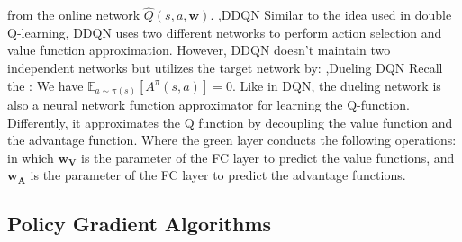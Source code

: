 \documentclass[10pt]{report}
\begin{document}
from the online network $\hat{Q}(s,a,\mathbf{w})$.
\sep{DDQN}
Similar to the idea used in double Q-learning, DDQN uses two different networks to perform action selection and value function approximation.
However, DDQN doesn't maintain two independent networks but utilizes the target network by:
\sep{Dueling DQN}
Recall the :
We have $\mathbb{E}_{a\sim\pi(s)}[A^{\pi}(s,a)]=0.$ Like in DQN, the dueling network is also a neural network function approximator for
learning the Q-function. Differently, it approximates the Q function by decoupling the value function and the advantage function.
Where the green layer conducts the following operations:
in which $\mathbf{w_V}$ is the parameter of the FC layer to predict the value functions, and $\mathbf{w_A}$ is the parameter of the FC layer to predict the advantage functions.

\subsection{Policy Gradient Algorithms}
\end{document}
